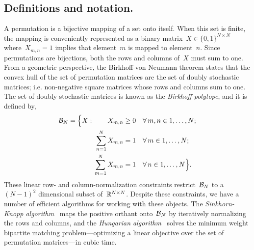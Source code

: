 \documentclass[twoside]{article}
\begin{document}
\subsection{Definitions and notation.}  A permutation is a bijective
mapping of a set onto itself.
When this set is finite, the mapping is conveniently
represented as a binary matrix~${X \in \{0,1\}^{N \times N}}$
where~${X_{m,n}=1}$ implies that element~$m$ is mapped to element~$n$.  Since
permutations are bijections, both the rows and columns of~$X$ must
sum to one.  From a geometric perspective, the Birkhoff-von Neumann
theorem states that the convex hull of the set of permutation matrices are the set of doubly stochastic matrices; i.e. non-negative square matrices
whose rows and columns sum to one. The set of doubly
stochastic matrices is known as the \emph{Birkhoff polytope}, and it
is defined by,
\begin{align*}
  \mathcal{B}_N = \Big \{X : \qquad 
           X_{m,n} &\geq 0   & &\forall \, m,n \in 1, \ldots, N; \\
           \sum_{n=1}^N X_{m,n} &= 1  & &\forall \, m \in 1, \ldots, N; \\
           \sum_{m=1}^N X_{m,n} & =1 &  &\forall \, n \in 1, \ldots, N \Big\}.
\end{align*}
These linear row- and column-normalization constraints
restrict~$\mathcal{B}_N$ to a~${(N-1)^2}$ dimensional subset
of~$\mathbb{R}^{N \times N}$.  Despite these constraints, we have a number
of efficient algorithms for working with these objects.  The
\emph{Sinkhorn-Knopp algorithm}~\citep{sinkhorn1967concerning}
maps the positive orthant onto~$\mathcal{B}_N$ by iteratively normalizing
the rows and columns, and the \emph{Hungarian
  algorithm}~\citep{kuhn1955hungarian, munkres1957algorithms} solves
the minimum weight bipartite matching problem---optimizing a linear
objective over the set of permutation matrices---in cubic time.
\end{document}
